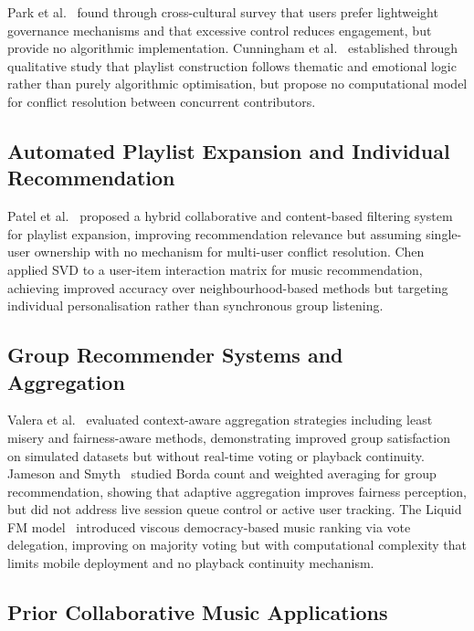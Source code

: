 \documentclass[pdflatex,sn-mathphys-num,iicol]{sn-jnl}
\theoremstyle{thmstyleone}%
\theoremstyle{thmstyletwo}%
\theoremstyle{thmstylethree}%
\begin{document}
Park et al.~\cite{jamvote_collaborative_playlists_study} found through cross-cultural
survey that users prefer lightweight governance mechanisms and that excessive control
reduces engagement, but provide no algorithmic implementation. Cunningham et
al.~\cite{jamvote_playlist_creation_art} established through qualitative study that
playlist construction follows thematic and emotional logic rather than purely algorithmic
optimisation, but propose no computational model for conflict resolution between
concurrent contributors.

\subsection{Automated Playlist Expansion and Individual Recommendation}

Patel et al.~\cite{jamvote_integrated_playlist} proposed a hybrid collaborative and
content-based filtering system for playlist expansion, improving recommendation relevance
but assuming single-user ownership with no mechanism for multi-user conflict resolution.
Chen~\cite{jamvote_cf_svd_ieee} applied SVD to a user-item interaction matrix for music
recommendation, achieving improved accuracy over neighbourhood-based methods but targeting
individual personalisation rather than synchronous group listening.

\subsection{Group Recommender Systems and Aggregation}

Valera et al.~\cite{jamvote_group_context_mdpi} evaluated context-aware aggregation
strategies including least misery and fairness-aware methods, demonstrating improved group
satisfaction on simulated datasets but without real-time voting or playback continuity.
Jameson and Smyth~\cite{jamvote_recommendation_groups} studied Borda count and weighted
averaging for group recommendation, showing that adaptive aggregation improves fairness
perception, but did not address live session queue control or active user tracking. The
Liquid FM model~\cite{jamvote_arxiv_social_music} introduced viscous democracy-based
music ranking via vote delegation, improving on majority voting but with computational
complexity that limits mobile deployment and no playback continuity mechanism.

\subsection{Prior Collaborative Music Applications}
\end{document}
